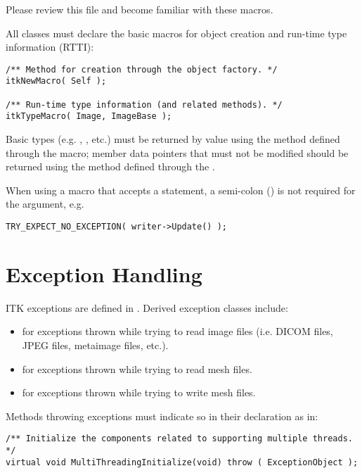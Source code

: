 Please review this file and become familiar with these macros.

All classes must declare the basic macros for object creation and run-time type
information (RTTI):

\small
\begin{verbatim}
/** Method for creation through the object factory. */
itkNewMacro( Self );

/** Run-time type information (and related methods). */
itkTypeMacro( Image, ImageBase );
\end{verbatim}
\normalsize

Basic types (e.g. , , etc.) must be returned by value
using the method defined through the  macro; member data
pointers that must not be modified should be returned using the method defined
through the .

When using a macro that accepts a statement, a semi-colon (\code{;}) is not
required for the argument, e.g.

\small
\begin{verbatim}
TRY_EXPECT_NO_EXCEPTION( writer->Update() );
\end{verbatim}
\normalsize


\section{Exception Handling}
\label{sec:ExceptionHandling}

ITK exceptions are defined in . Derived exception
classes include:
\begin{itemize}
\item {} for exceptions thrown while trying to
read image files (i.e. DICOM files, JPEG files, metaimage files, etc.).
\item {} for exceptions thrown while trying to
read mesh files.
\item {} for exceptions thrown while trying to
write mesh files.
\end{itemize}

Methods throwing exceptions must indicate so in their declaration as in:

\small
\begin{verbatim}
/** Initialize the components related to supporting multiple threads. */
virtual void MultiThreadingInitialize(void) throw ( ExceptionObject );
\end{verbatim}
\normalsize

